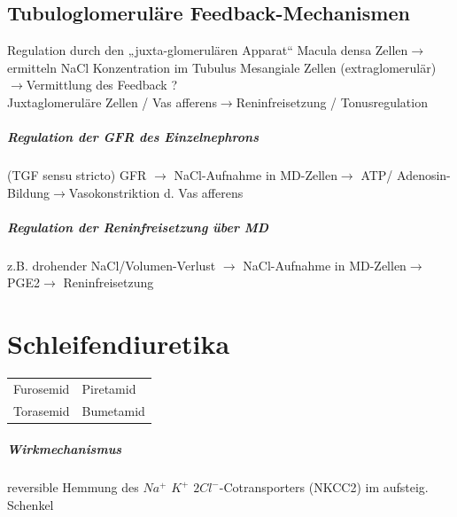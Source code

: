 \documentclass[10pt,a4paper]{report}
\begin{document}
\subsection{Tubuloglomeruläre Feedback-Mechanismen}
Regulation durch den „juxta-glomerulären Apparat“ Macula densa Zellen$\rightarrow$ermitteln NaCl Konzentration im Tubulus Mesangiale Zellen (extraglomerulär)$\rightarrow$Vermittlung des Feedback ?
\\ 
Juxtaglomeruläre Zellen / Vas afferens$\rightarrow$Reninfreisetzung / Tonusregulation
\subparagraph{Regulation der GFR des Einzelnephrons} 
(TGF sensu stricto) GFR $\rightarrow$ NaCl-Aufnahme in MD-Zellen$\rightarrow$ ATP/ Adenosin-Bildung$\rightarrow$Vasokonstriktion d. Vas afferens
\subparagraph{Regulation der Reninfreisetzung über MD} z.B. drohender 
NaCl/Volumen-Verlust $\rightarrow$ NaCl-Aufnahme in MD-Zellen$\rightarrow$ PGE2$\rightarrow$ Reninfreisetzung
\section{Schleifendiuretika}
\begin{tabularx}{\textwidth}{XX}
Furosemid&Piretamid\\ 	  
Torasemid&Bumetamid\\
\end{tabularx}
\subparagraph{Wirkmechanismus}
reversible Hemmung des $Na^+$ $K^+$ $2Cl^-$-Cotransporters (NKCC2) im aufsteig. Schenkel 
\end{document}
